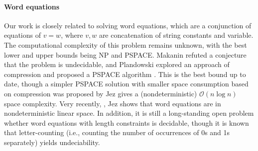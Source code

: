 \paragraph{Word equations} Our work is closely related to solving word equations, which are a conjunction of equations of $v=w$, where $v, w$ are concatenation of string constants and variable. The computational complexity of this problem remains unknown, with the best lower and upper bounds being NP and PSPACE. Makanin refuted a conjecture that the problem is undecidable, and %
Plandowski explored an approach of compression and proposed a PSPACE algorithm \cite{P04}.  This is the best bound up to date, though a simpler PSPACE solution with smaller space consumption based on compression was proposed by Jez \cite{J16}  gives a (nondeterministic) $\mathcal{O}(n \log n)$ space complexity. Very recently, \cite{J17}, Jez shows that word equations are in nondeterministic linear space. 
In addition, it is still a long-standing open problem whether word equations with length constraints is decidable, though it is known that letter-counting (i.e., counting the number of occurrences of 0s and 1s separately) yields undeciability.  





%


